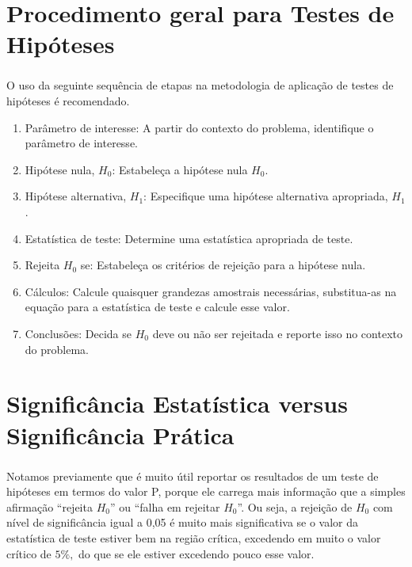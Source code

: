 \documentclass[14pt,aspectratio=1610]{beamer}
\newcommand{\Ho}{\ensuremath{H_{0}}}
\newcommand{\Hi}{\ensuremath{H_{1}}}
\begin{document}

\section{Procedimento geral para Testes de Hipóteses}
\begin{frame}{}
\frametitle{}
\begin{block}{}
\justifying
O uso da seguinte sequência de etapas na metodologia de aplicação de testes de hipóteses é recomendado.
\begin{enumerate}
\item Parâmetro de interesse: A partir do contexto do problema, identifique o parâmetro de interesse.\pause
\item Hipótese nula, $\Ho$: Estabeleça a hipótese nula $\Ho$. \pause
\item Hipótese alternativa, $\Hi$: Especifique uma hipótese alternativa apropriada, $\Hi$.\pause
\item Estatística de teste: Determine uma estatística apropriada de teste.\pause
\item Rejeita $\Ho$ se: Estabeleça os critérios de rejeição para a hipótese nula.\pause
\item Cálculos: Calcule quaisquer grandezas amostrais necessárias, substitua-as na equação para a estatística de teste e calcule esse valor.\pause
\item Conclusões: Decida se $\Ho$ deve ou não ser rejeitada e reporte isso no contexto do problema.
\end{enumerate}
\end{block}
\end{frame}

\section{Significância Estatística versus Significância Prática}
\begin{frame}{}
\frametitle{}
\begin{block}{}
\justifying
Notamos previamente que é muito útil reportar os resultados de um teste de hipóteses em termos do valor P, porque ele carrega mais informação que a simples 
afirmação ``rejeita $\Ho$'' ou ``falha em rejeitar $\Ho$''. Ou seja, a rejeição de $\Ho$ com nível de significância igual a 0,05 é muito mais significativa se o valor da estatística 
de teste estiver bem na região crítica, excedendo em muito o valor crítico de $5\%,$ do que se ele estiver excedendo pouco esse valor.
\end{block}
\end{frame}
\end{document}
